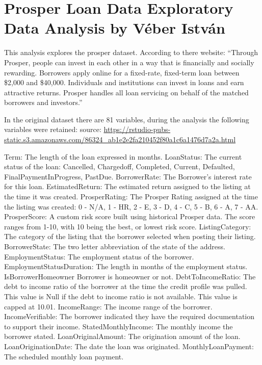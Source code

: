 \documentclass[]{article}
\title{}
\author{}
\date{}
\begin{document}
\section{Prosper Loan Data Exploratory Data Analysis by Véber
István}\label{prosper-loan-data-exploratory-data-analysis-by-veber-istvan}

This analysis explores the prosper dataset. According to there website:
``Through Prosper, people can invest in each other in a way that is
financially and socially rewarding. Borrowers apply online for a
fixed-rate, fixed-term loan between \$2,000 and \$40,000. Individuals
and institutions can invest in loans and earn attractive returns.
Prosper handles all loan servicing on behalf of the matched borrowers
and investors.''

In the original dataset there are 81 variables, during the analysis the
following variables were retained: source:
\url{https://rstudio-pubs-static.s3.amazonaws.com/86324_ab1e2e2fa210452f80a1c6a1476d7a2a.html}

Term: The length of the loan expressed in months. LoanStatus: The
current status of the loan: Cancelled, Chargedoff, Completed, Current,
Defaulted, FinalPaymentInProgress, PastDue. BorrowerRate: The Borrower's
interest rate for this loan. EstimatedReturn: The estimated return
assigned to the listing at the time it was created. ProsperRating: The
Prosper Rating assigned at the time the listing was created: 0 - N/A, 1
- HR, 2 - E, 3 - D, 4 - C, 5 - B, 6 - A, 7 - AA. ProsperScore: A custom
risk score built using historical Prosper data. The score ranges from
1-10, with 10 being the best, or lowest risk score. ListingCategory: The
category of the listing that the borrower selected when posting their
listing. BorrowerState: The two letter abbreviation of the state of the
address. EmploymentStatus: The employment status of the borrower.
EmploymentStatusDuration: The length in months of the employment status.
IsBorrowerHomeowner Borrower is homeowner or not. DebtToIncomeRatio: The
debt to income ratio of the borrower at the time the credit profile was
pulled. This value is Null if the debt to income ratio is not available.
This value is capped at 10.01. IncomeRange: The income range of the
borrower. IncomeVerifiable: The borrower indicated they have the
required documentation to support their income. StatedMonthlyIncome: The
monthly income the borrower stated. LoanOriginalAmount: The origination
amount of the loan. LoanOriginationDate: The date the loan was
originated. MonthlyLoanPayment: The scheduled monthly loan payment.
\end{document}
